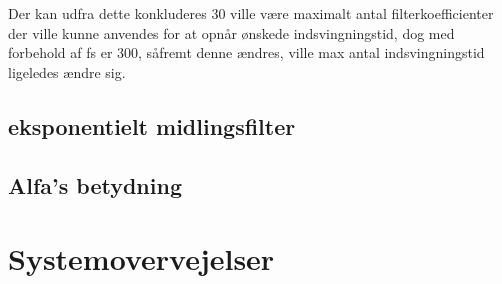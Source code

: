 \documentclass{article}
\begin{document}
Der kan udfra dette konkluderes 30 ville være maximalt antal filterkoefficienter der ville kunne anvendes for at opnår ønskede indsvingningstid, dog med forbehold af fs er 300, såfremt denne ændres, ville max antal indsvingningstid ligeledes ændre sig.

\subsection{eksponentielt midlingsfilter}
\label{sec:alfa}

\subsection{Alfa's betydning}
\label{sec:alfa}

\section{Systemovervejelser}
\label{sec:Systemovervejelser}
\end{document}
